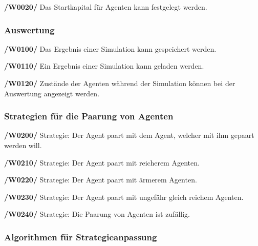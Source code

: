 \textbf{/W0020/}
Das Startkapital für Agenten kann festgelegt werden.

\subsubsection{Auswertung}

\textbf{/W0100/}
Das Ergebnis einer Simulation kann gespeichert werden.

\textbf{/W0110/}
Ein Ergebnis einer Simulation kann geladen werden.

\textbf{/W0120/}
Zustände der Agenten während der Simulation können bei der Auswertung angezeigt werden.

\subsubsection{Strategien für die Paarung von Agenten}

\textbf{/W0200/}
Strategie: Der Agent paart mit dem Agent, welcher mit ihm gepaart werden will.

\textbf{/W0210/} 
Strategie: Der Agent paart mit reicherem Agenten.

\textbf{/W0220/}
Strategie: Der Agent paart mit ärmerem Agenten.

\textbf{/W0230/}
Strategie: Der Agent paart mit ungefähr gleich reichem Agenten.

\textbf{/W0240/}
Strategie: Die Paarung von Agenten ist zufällig.


\subsubsection{Algorithmen für Strategieanpassung}

